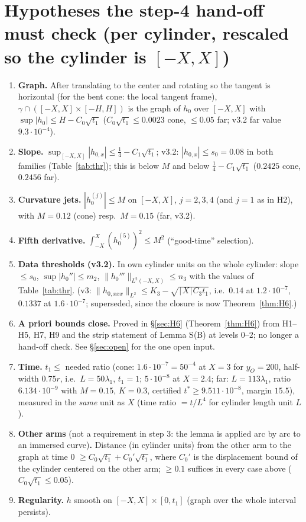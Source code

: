 \documentclass[11pt]{article}
\begin{document}
\section{Hypotheses the step-4 hand-off must check (per cylinder, rescaled so the cylinder is $[-X,X]$)}
\begin{enumerate}
\item[H1] \textbf{Graph.} After translating to the center and rotating so the tangent is horizontal (for the bent cone: the local tangent frame), $\gamma\cap([-X,X]\times[-H,H])$ is the graph of $h_0$ over $[-X,X]$ with $\sup|h_0|\le H-C_0\sqrt{t_1}$ ($C_0\sqrt{t_1}\le0.0023$ cone, $\le0.05$ far; v3.2 far value $9.3\cdot10^{-4}$).
\item[H2] \textbf{Slope.} $\sup_{[-X,X]}|h_{0,x}|\le\frac14-C_1\sqrt{t_1}$; v3.2: $|h_{0,x}|\le s_0=0.08$ in both families (Table~\ref{tab:thr}); this is below $M$ and below $\frac14-C_1\sqrt{t_1}$ ($0.2425$ cone, $0.2456$ far).
\item[H3] \textbf{Curvature jets.} $|h_0^{(j)}|\le M$ on $[-X,X]$, $j=2,3,4$ (and $j=1$ as in H2), with $M=0.12$ (cone) resp.\ $M=0.15$ (far, v3.2).
\item[H4] \textbf{Fifth derivative.} $\int_{-X}^X(h_0^{(5)})^2\le M^2$ (``good-time'' selection).
\item[H5] \textbf{Data thresholds (v3.2).} In own cylinder units on the whole cylinder: slope $\le s_0$, $\sup|h_0''|\le m_2$, $\|h_0'''\|_{L^2(-X,X)}\le n_3$ with the values of Table~\ref{tab:thr}. (v3: $\|h_{0,xxx}\|_{L^2}\le K_3-\sqrt{\lceil X\rceil C_3t_1}$, i.e.\ $0.14$ at $1.2\cdot10^{-7}$, $0.1337$ at $1.6\cdot10^{-7}$; superseded, since the closure is now Theorem~\ref{thm:H6}.)
\item[H6] \textbf{A priori bounds close.} Proved in \S\ref{sec:H6} (Theorem~\ref{thm:H6}) from H1--H5, H7, H9 and the strip statement of Lemma S(B) at levels $0$--$2$; no longer a hand-off check. See \S\ref{sec:open} for the one open input.
\item[H7] \textbf{Time.} $t_1\le$ needed ratio (cone: $1.6\cdot10^{-7}=50^{-4}$ at $X=3$ for $y_O=200$, half-width $0.75r$, i.e.\ $L=50\lambda_1$, $t_1=1$; $5\cdot10^{-8}$ at $X=2.4$; far: $L=113\lambda_1$, ratio $6.134\cdot10^{-9}$ with $M=0.15$, $K=0.3$, certified $t^*\ge9.511\cdot10^{-8}$, margin $15.5$), measured in the \emph{same} unit as $X$ (time ratio $=t/L^4$ for cylinder length unit $L$).
\item[H8] \textbf{Other arms} (not a requirement in step 3: the lemma is applied arc by arc to an immersed curve)\textbf{.} Distance (in cylinder units) from the other arm to the graph at time $0$ $\ge C_0\sqrt{t_1}+C_0'\sqrt{t_1}$, where $C_0'$ is the displacement bound of the cylinder centered on the other arm; $\ge0.1$ suffices in every case above ($C_0\sqrt{t_1}\le0.05$).
\item[H9] \textbf{Regularity.} $h$ smooth on $[-X,X]\times[0,t_1]$ (graph over the whole interval persists).
\end{enumerate}
\end{document}
